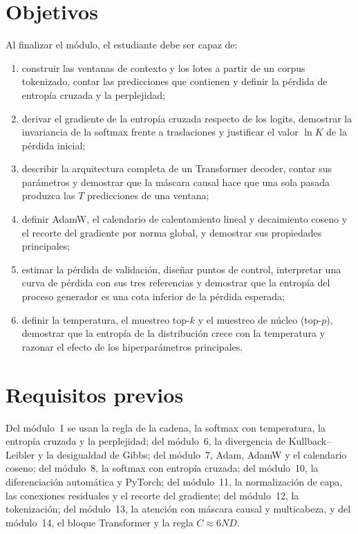 \documentclass[11pt,a4paper,twoside,openany]{book}
\begin{document}
\section*{Objetivos}
Al finalizar el módulo, el estudiante debe ser capaz de:
\begin{enumerate}[label=\arabic*.]
  \item construir las ventanas de contexto y los lotes a partir de un corpus tokenizado, contar las predicciones que contienen y definir la pérdida de entropía cruzada y la perplejidad;
  \item derivar el gradiente de la entropía cruzada respecto de los logits, demostrar la invariancia de la softmax frente a traslaciones y justificar el valor $\ln K$ de la pérdida inicial;
  \item describir la arquitectura completa de un Transformer decoder, contar sus parámetros y demostrar que la máscara causal hace que una sola pasada produzca las $T$ predicciones de una ventana;
  \item definir AdamW, el calendario de calentamiento lineal y decaimiento coseno y el recorte del gradiente por norma global, y demostrar sus propiedades principales;
  \item estimar la pérdida de validación, diseñar puntos de control, interpretar una curva de pérdida con sus tres referencias y demostrar que la entropía del proceso generador es una cota inferior de la pérdida esperada;
  \item definir la temperatura, el muestreo top-$k$ y el muestreo de núcleo (top-$p$), demostrar que la entropía de la distribución crece con la temperatura y razonar el efecto de los hiperparámetros principales.
\end{enumerate}

\section*{Requisitos previos}
Del módulo~1 se usan la regla de la cadena, la softmax con temperatura, la entropía cruzada y la perplejidad; del módulo~6, la divergencia de Kullback--Leibler y la desigualdad de Gibbs; del módulo~7, Adam, AdamW y el calendario coseno; del módulo~8, la softmax con entropía cruzada; del módulo~10, la diferenciación automática y PyTorch; del módulo~11, la normalización de capa, las conexiones residuales y el recorte del gradiente; del módulo~12, la tokenización; del módulo~13, la atención con máscara causal y multicabeza, y del módulo~14, el bloque Transformer y la regla $C\approx 6ND$.
\end{document}
